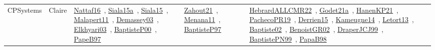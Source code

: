 {\begin{longtable}{lp{3cm}>{\raggedright\arraybackslash}p{6cm}>{\raggedright\arraybackslash}p{6cm}>{\raggedright\arraybackslash}p{8cm}}
\index{Claire}\index{CPSystems!Claire}CPSystems & Claire & \href{../works/Nattaf16.pdf}{Nattaf16}~\cite{Nattaf16}, \href{../works/Siala15a.pdf}{Siala15a}~\cite{Siala15a}, \href{../works/Siala15.pdf}{Siala15}~\cite{Siala15}, \href{../works/Malapert11.pdf}{Malapert11}~\cite{Malapert11}, \href{../works/Demassey03.pdf}{Demassey03}~\cite{Demassey03}, \href{../works/Elkhyari03.pdf}{Elkhyari03}~\cite{Elkhyari03}, \href{../works/BaptisteP00.pdf}{BaptisteP00}~\cite{BaptisteP00}, \href{../works/PapeB97.pdf}{PapeB97}~\cite{PapeB97} & \href{../works/Zahout21.pdf}{Zahout21}~\cite{Zahout21}, \href{../works/Menana11.pdf}{Menana11}~\cite{Menana11}, \href{../works/BaptisteP97.pdf}{BaptisteP97}~\cite{BaptisteP97} & \href{../works/HebrardALLCMR22.pdf}{HebrardALLCMR22}~\cite{HebrardALLCMR22}, \href{../works/Godet21a.pdf}{Godet21a}~\cite{Godet21a}, \href{../works/HanenKP21.pdf}{HanenKP21}~\cite{HanenKP21}, \href{../works/PachecoPR19.pdf}{PachecoPR19}~\cite{PachecoPR19}, \href{../works/Derrien15.pdf}{Derrien15}~\cite{Derrien15}, \href{../works/Kameugne14.pdf}{Kameugne14}~\cite{Kameugne14}, \href{../works/Letort13.pdf}{Letort13}~\cite{Letort13}, \href{../works/Baptiste02.pdf}{Baptiste02}~\cite{Baptiste02}, \href{../works/BenoistGR02.pdf}{BenoistGR02}~\cite{BenoistGR02}, \href{../works/DraperJCJ99.pdf}{DraperJCJ99}~\cite{DraperJCJ99}, \href{../works/BaptistePN99.pdf}{BaptistePN99}~\cite{BaptistePN99}, \href{../works/PapaB98.pdf}{PapaB98}~\cite{PapaB98}\\

\end{longtable}}

